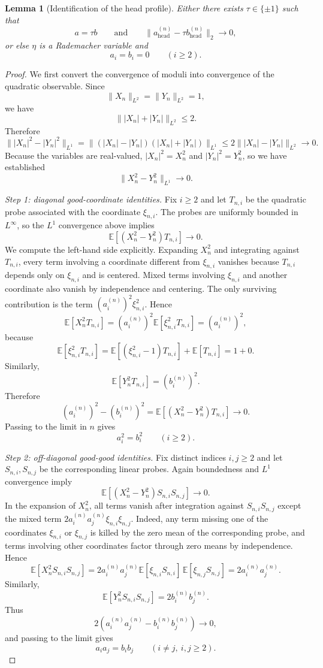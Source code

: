 \documentclass[11pt]{amsart}
\numberwithin{equation}{section}
\newtheorem{lemma}[theorem]{Lemma}
\theoremstyle{definition}
\theoremstyle{remark}
\newcommand{\E}{\mathbb E}
\newcommand{\norm}[1]{\lVert #1 \rVert}
\begin{document}
\begin{lemma}[Identification of the head profile]\label{lem:head-sign}
Either there exists $\tau\in\{\pm1\}$ such that
\[
a=\tau b
\qquad\text{and}\qquad
\norm{a_{\mathrm{head}}^{(n)}-\tau b_{\mathrm{head}}^{(n)}}_2\to0,
\]
or else $\eta$ is a Rademacher variable and
\[
a_i=b_i=0
\qquad(i\ge2).
\]
\end{lemma}

\begin{proof}
We first convert the convergence of moduli into convergence of the quadratic
observable. Since
\[
\norm{X_n}_{L^2}=\norm{Y_n}_{L^2}=1,
\]
we have
\[
\norm{|X_n|+|Y_n|}_{L^2}\le 2.
\]
Therefore
\[
\norm{|X_n|^2-|Y_n|^2}_{L^1}
=\norm{(|X_n|-|Y_n|)(|X_n|+|Y_n|)}_{L^1}
\le 2\norm{|X_n|-|Y_n|}_{L^2}
\longrightarrow0.
\]
Because the variables are real-valued, $|X_n|^2=X_n^2$ and $|Y_n|^2=Y_n^2$,
so we have established
\[
\norm{X_n^2-Y_n^2}_{L^1}\longrightarrow0.
\]

\smallskip
\noindent\emph{Step 1: diagonal good-coordinate identities.}
Fix $i\ge2$ and let $T_{n,i}$ be the quadratic probe associated with the
coordinate $\xi_{n,i}$.  The probes are uniformly bounded in $L^\infty$, so the
$L^1$ convergence above implies
\[
\E[(X_n^2-Y_n^2)T_{n,i}]\longrightarrow0.
\]
We compute the left-hand side explicitly.  Expanding $X_n^2$ and integrating
against $T_{n,i}$, every term involving a coordinate different from
$\xi_{n,i}$ vanishes because $T_{n,i}$ depends only on $\xi_{n,i}$ and is
centered.  Mixed terms involving $\xi_{n,i}$ and another coordinate also
vanish by independence and centering.  The only surviving contribution is the
term $(a_i^{(n)})^2\xi_{n,i}^2$.  Hence
\[
\E[X_n^2T_{n,i}]
=(a_i^{(n)})^2\E[\xi_{n,i}^2T_{n,i}]
=(a_i^{(n)})^2,
\]
because
\[
\E[\xi_{n,i}^2T_{n,i}]
=\E[(\xi_{n,i}^2-1)T_{n,i}]+\E[T_{n,i}]
=1+0.
\]
Similarly,
\[
\E[Y_n^2T_{n,i}]=(b_i^{(n)})^2.
\]
Therefore
\[
(a_i^{(n)})^2-(b_i^{(n)})^2
=\E[(X_n^2-Y_n^2)T_{n,i}]
\longrightarrow0.
\]
Passing to the limit in $n$ gives
\[
a_i^2=b_i^2
\qquad(i\ge2).
\]

\smallskip
\noindent\emph{Step 2: off-diagonal good-good identities.}
Fix distinct indices $i,j\ge2$ and let $S_{n,i},S_{n,j}$ be the corresponding
linear probes.  Again boundedness and $L^1$ convergence imply
\[
\E[(X_n^2-Y_n^2)S_{n,i}S_{n,j}]\longrightarrow0.
\]
In the expansion of $X_n^2$, all terms vanish after integration against
$S_{n,i}S_{n,j}$ except the mixed term
$2a_i^{(n)}a_j^{(n)}\xi_{n,i}\xi_{n,j}$.  Indeed, any term missing one of the
coordinates $\xi_{n,i}$ or $\xi_{n,j}$ is killed by the zero mean of the
corresponding probe, and terms involving other coordinates factor through zero
means by independence.  Hence
\[
\E[X_n^2S_{n,i}S_{n,j}]
=2a_i^{(n)}a_j^{(n)}
\E[\xi_{n,i}S_{n,i}]\,\E[\xi_{n,j}S_{n,j}]
=2a_i^{(n)}a_j^{(n)}.
\]
Similarly,
\[
\E[Y_n^2S_{n,i}S_{n,j}]
=2b_i^{(n)}b_j^{(n)}.
\]
Thus
\[
2(a_i^{(n)}a_j^{(n)}-b_i^{(n)}b_j^{(n)})\longrightarrow0,
\]
and passing to the limit gives
\[
a_ia_j=b_ib_j
\qquad(i\ne j,\ i,j\ge2).
\]


\end{proof}
\end{document}
